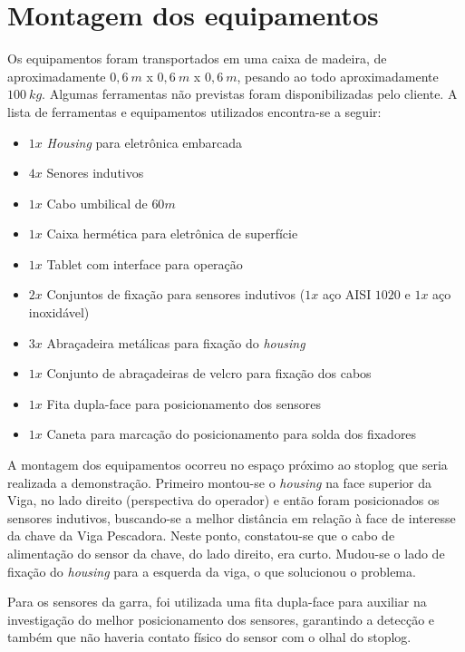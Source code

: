 \section{Montagem dos equipamentos}

Os equipamentos foram transportados em uma caixa de madeira, de aproximadamente
$0,6~m$ x $0,6~m$ x $0,6~m$, pesando ao todo aproximadamente $100~kg$. Algumas
ferramentas não previstas foram disponibilizadas pelo cliente. A lista de
ferramentas e equipamentos utilizados encontra-se a seguir:

\begin{itemize}
  \item $1x$ \textit{Housing} para eletrônica embarcada
  \item $4x$ Senores indutivos
  \item $1x$ Cabo umbilical de $60m$
  \item $1x$ Caixa hermética para eletrônica de superfície
  \item $1x$ Tablet com interface para operação
  \item $2x$ Conjuntos de fixação para sensores indutivos ($1x$ aço AISI $1020$
  e $1x$ aço inoxidável)
  \item $3x$ Abraçadeira metálicas para fixação do \textit{housing}
  \item $1x$ Conjunto de abraçadeiras de velcro para fixação dos cabos
  \item $1x$ Fita dupla-face para posicionamento dos sensores
  \item $1x$ Caneta para marcação do posicionamento para solda dos fixadores
 \end{itemize}
 
 A montagem dos equipamentos ocorreu no espaço próximo ao stoplog que seria
 realizada a demonstração. Primeiro montou-se o \textit{housing} na face
 superior da Viga, no lado direito (perspectiva do operador) e então foram
 posicionados os sensores indutivos, buscando-se a melhor distância em relação à
 face de interesse da chave da Viga Pescadora. Neste ponto, constatou-se que o
 cabo de alimentação do sensor da chave, do lado direito, era curto. Mudou-se o
 lado de fixação do \textit{housing} para a esquerda da viga, o que solucionou o problema.
 
 
 Para os sensores da garra, foi utilizada uma fita dupla-face
 para auxiliar na investigação do melhor posicionamento dos sensores, garantindo
 a detecção e também que não haveria contato físico do sensor com o olhal do
 stoplog.
 
